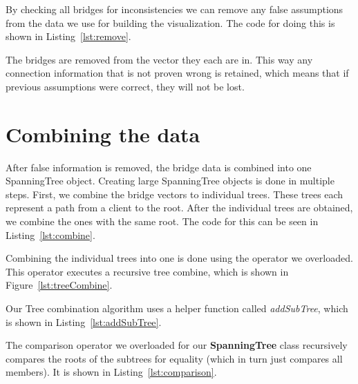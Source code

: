 By checking all bridges for inconsistencies we can remove any false assumptions from the data we use for building the visualization.
The code for doing this is shown in Listing~\ref{lst:remove}.

The bridges are removed from the vector they each are in.
This way any connection information that is not proven wrong is retained, which means that if previous assumptions were correct, they will not be lost.
\section{Combining the data}
\label{combining_data}
After false information is removed, the bridge data is combined into one SpanningTree object.
Creating large SpanningTree objects is done in multiple steps.
First, we combine the bridge vectors to individual trees.
These trees each represent a path from a client to the root.
After the individual trees are obtained, we combine the ones with the same root.
The code for this can be seen in Listing~\ref{lst:combine}.


Combining the individual trees into one is done using the operator we overloaded.
This operator executes a recursive tree combine, which is shown in Figure~\ref{lst:treeCombine}.


Our Tree combination algorithm uses a helper function called \textit{addSubTree}, which is shown in Listing~\ref{lst:addSubTree}.


The comparison operator we overloaded for our \textbf{SpanningTree} class recursively compares the roots of the subtrees for equality (which in turn just compares all members).
It is shown in Listing~\ref{lst:comparison}.


